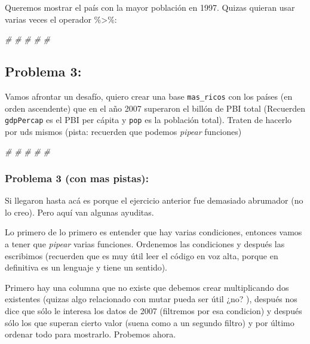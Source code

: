 \documentclass[
]{book}
\newenvironment{Shaded}{\begin{snugshade}}{\end{snugshade}}
\newcommand{\CommentTok}[1]{\textcolor[rgb]{0.56,0.35,0.01}{\textit{#1}}}
\begin{document}
Queremos mostrar el país con la mayor población en 1997. Quizas quieran usar varias veces el operador \%\textgreater\%:

\begin{Shaded}
\begin{Highlighting}[]
\CommentTok{\#}
\CommentTok{\#}
\CommentTok{\#}
\CommentTok{\#}
\CommentTok{\#}
\end{Highlighting}
\end{Shaded}

\hypertarget{problema-3}{%
\subsection{Problema 3:}\label{problema-3}}

Vamos afrontar un desafío, quiero crear una base \texttt{mas\_ricos} con los países (en orden ascendente) que en el año 2007 superaron el billón de PBI total (Recuerden \texttt{gdpPercap} es el PBI per cápita y \texttt{pop} es la población total). Traten de hacerlo por uds mismos (pista: recuerden que podemos \emph{pipear} funciones)

\begin{Shaded}
\begin{Highlighting}[]
\CommentTok{\#}
\CommentTok{\#}
\CommentTok{\#}
\CommentTok{\#}
\CommentTok{\#}
\end{Highlighting}
\end{Shaded}

\hypertarget{problema-3-con-mas-pistas}{%
\subsubsection{Problema 3 (con mas pistas):}\label{problema-3-con-mas-pistas}}

Si llegaron hasta acá es porque el ejercicio anterior fue demasiado abrumador (no lo creo). Pero aquí van algunas ayuditas.

Lo primero de lo primero es entender que hay varias condiciones, entonces vamos a tener que \emph{pipear} varias funciones. Ordenemos las condiciones y después las escribimos (recuerden que es muy útil leer el código en voz alta, porque en definitiva es un lenguaje y tiene un sentido).

Primero hay una columna que no existe que debemos crear multiplicando dos existentes (quizas algo relacionado con mutar pueda ser útil ¿no? ), después nos dice que sólo le interesa los datos de 2007 (filtremos por esa condicion) y después sólo los que superan cierto valor (suena como a un segundo filtro) y por último ordenar todo para mostrarlo. Probemos ahora.
\end{document}
